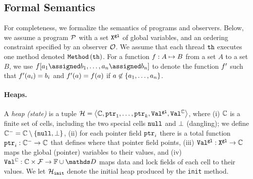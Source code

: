 
\subsection{Formal Semantics}
\label{semantics:section}
For completeness, we formalize the semantics of programs and
observers. Below, we assume a program ${\mathcal P}$  with a set 
${\tt X}^{\tt gl}$ of global variables, and an ordering constraint
specified by an observer ${\mathcal O}$.
%
We assume that each thread ${\tt th}$ executes one method
denoted ${\tt Method}\left({\tt th}\right)$.
For a function $f:A\mapsto B$ from a set $A$ to
a set $B$, we use 
$\fun[\aelem_1\assigned\belem_1,\ldots,\aelem_\nn\assigned\belem_\nn]$ 
to denote the function
$f'$ such that $f'(a_i)=b_i$ and 
$f'(a)=f(a)$ if 
$a\not\in\left\{a_1,\ldots,a_n\right\}$.
%

%



\paragraph{Heaps.}
A {\it heap (state)} is a tuple ${\mathcal H}=\left\langle{\mathbb C},\mathtt{ptr}_1, \ldots , \mathtt{ptr}_k,{\tt Val}^{\tt gl},{\tt Val}^{{\mathbb C}}\right\rangle$, where
(i)
${\mathbb C}$ is a finite set of cells, including the two special cells
${\tt null}$ and $\bot$ (dangling);
%
we define ${\mathbb C}^{-}={\mathbb C}\setminus\left\{{\tt null},\bot\right\}$,
%
(ii)
for each pointer field $\mathtt{ptr}_i$ there is a total function
$\mathtt{ptr}_i:{\mathbb C}^{-}\to{\mathbb C}$
that defines where that pointer field points,
(iii)
${\tt Val}^{\tt gl}:{\tt X}^{\tt gl}\to{\mathbb C}$ maps the global (pointer)
variables to their values, and
(iv)
$\cellval:\cellset\times\fieldset\to\fset\cup\ddomain$
maps data and lock fields of each cell to their values.
%
We let ${\mathcal H}_{\tt init}$ denote the initial heap produced by the
{\tt init} method.

